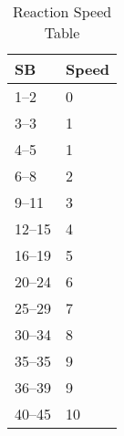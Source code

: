 \begin{table}[h]
	\begin{tabular}{ll}
	SB 		& Speed \\
	\hline
	1--2	& 0		   \\
	3--3	& 1		   \\
	4--5	& 1		   \\
	6--8	& 2		   \\
	9--11	& 3		   \\
	12--15  & 4		   \\
	16--19  & 5		   \\
	20--24  & 6		   \\
	25--29  & 7		   \\
	30--34  & 8		   \\
	35--35  & 9		   \\
	36--39  & 9		   \\ 
	40--45  & 10	   \\ 
    \end{tabular}
    \caption{Reaction Speed Table}
\end{table}
